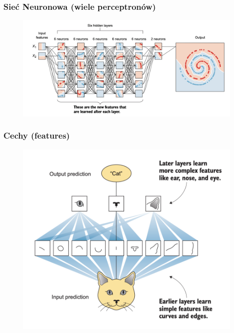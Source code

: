 \documentclass[smaller]{beamer}
\begin{document}
\begin{frame}
\frametitle{Sieć Neuronowa (wiele perceptronów)}
    \begin{figure}
        \centering
        \includegraphics[width=\textwidth,height=\textheight,keepaspectratio]{../manifest/mlp-features.png}
    \end{figure}
\end{frame}


\begin{frame}
\frametitle{Cechy (features)}
    \begin{figure}
        \centering
        \includegraphics[width=\textwidth,height=0.7\textheight,keepaspectratio]{../manifest/cat.png}
    \end{figure}
\end{frame}
\end{document}

